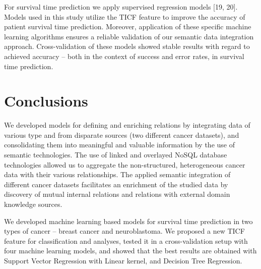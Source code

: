 \documentclass{bmcart}
\begin{document}
For survival time prediction we apply supervised regression models [19,
20]. Models used in this study utilize the TICF feature to improve the
accuracy of patient survival time prediction. Moreover, application of
these specific machine learning algorithms ensures a reliable
validation of our semantic data integration approach. Cross-validation
of these models showed stable results with regard to achieved accuracy
-- both in the context of success and error rates, in survival time
prediction.  

\section{Conclusions}

We developed models for defining and enriching relations by integrating
data of various type and from disparate sources (two different cancer
datasets), and consolidating them into meaningful and valuable
information by the use of semantic technologies. The use of linked and
overlayed NoSQL database technologies allowed us to aggregate the
non-structured, heterogeneous cancer data with their various
relationships. The applied semantic integration of different cancer
datasets facilitates an enrichment of the studied data by discovery of
mutual internal relations and relations with external domain knowledge
sources. 

We developed machine learning based models for survival time prediction
in two types of cancer {}-- breast cancer and neuroblastoma. We
proposed a new TICF feature for classification and analyses, tested it
in a cross-validation setup with four machine learning models, and
showed that the best results are obtained with Support Vector
Regression with Linear kernel, and Decision Tree Regression. 




\end{document}
